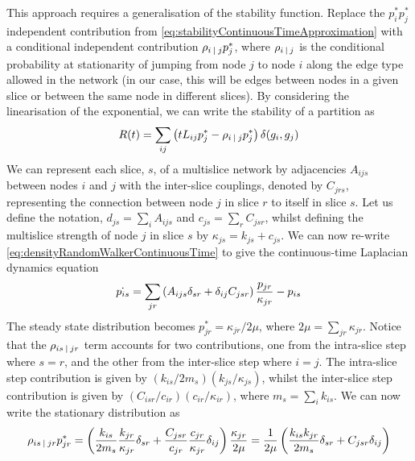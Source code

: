 This approach requires a generalisation of the stability function.
Replace the $p_{i}^{*} p_{j}^{*}$ independent contribution from \cref{eq:stabilityContinuousTimeApproximation} with a conditional independent contribution $\rho_{i \:\lvert\: j} p_{j}^{*}$, where $\rho_{i \:\lvert\: j}$ is the conditional probability at stationarity of jumping from node $j$ to node $i$ along the edge type allowed in the network (in our case, this will be edges between nodes in a given slice or between the same node in different slices).
By considering the linearisation of the exponential, we can write the stability of a partition as
\begin{equation}
	\label{eq:multisliceStability}
	R(t) = \sum_{ij} \left( tL_{ij} p_{j}^{*} - \rho_{i \:\lvert\: j} p_{j}^{*} \right) \delta(g_{i},g_{j})
\end{equation}
We can represent each slice, $s$, of a multislice network by adjacencies $A_{ijs}$ between nodes $i$ and $j$ with the inter-slice couplings, denoted by $C_{jrs}$, representing the connection between node $j$ in slice $r$ to itself in slice $s$.
Let us define the notation, $d_{js} = \sum_{i} A_{ijs}$ and $c_{js} = \sum_{r} C_{jsr}$, whilst defining the multislice strength of node $j$ in slice $s$ by $\kappa_{js} = k_{js} + c_{js}$.
We can now re-write \cref{eq:densityRandomWalkerContinuousTime} to give the continuous-time Laplacian dynamics equation
\begin{equation}
	\label{eq:continuousTimeLaplacianDynamics}
	\dot{p_{is}} = \sum_{jr} \left( A_{ijs} \delta_{sr} +\delta_{ij} C_{jsr} \right) \frac{p_{jr}}{\kappa_{jr}} - p_{is}
\end{equation}
The steady state distribution becomes $p_{jr}^{*} = \kappa_{jr}/2\mu$, where $2\mu = \sum_{jr} \kappa_{jr}$.
Notice that the $\rho_{is \:\lvert\: jr}$ term accounts for two contributions, one from the intra-slice step where $s=r$, and the other from the inter-slice step where $i=j$.
The intra-slice step contribution is given by $\left( k_{is}/2m_{s} \right) \left( k_{js}/\kappa_{js} \right)$, whilst the inter-slice step contribution is given by $\left( C_{isr}/c_{ir} \right) \left( c_{ir}/\kappa_{ir} \right)$, where $m_{s} = \sum_{i} k_{is}$.
We can now write the stationary distribution as
\begin{equation}
	\label{eq:continuousTimeLaplacianDynamicsStationaryDistribution}
	\rho_{is \:\lvert\: jr} p_{jr}^{*} = \left( \frac{k_{is}}{2m_{s}} \frac{k_{jr}}{\kappa_{jr}} \delta_{sr} + \frac{C_{jsr}}{c_{jr}} \frac{c_{jr}}{\kappa_{jr}} \delta_{ij} \right) \frac{\kappa_{jr}}{2\mu} = \frac{1}{2\mu} \left( \frac{k_{is}k_{jr}}{2m_{s}} \delta_{sr} + C_{jsr} \delta_{ij} \right)
\end{equation}
